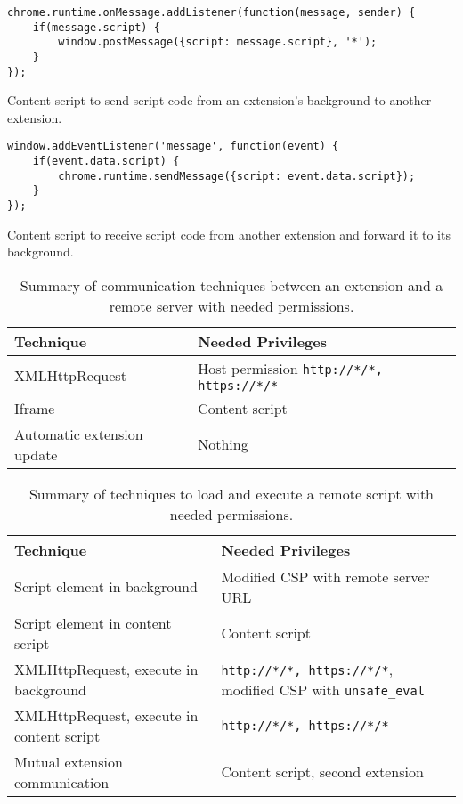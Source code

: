 	\begin{code}
		\begin{lstlisting}
chrome.runtime.onMessage.addListener(function(message, sender) {
	if(message.script) {
		window.postMessage({script: message.script}, '*');
	}
});
\end{lstlisting}
		\caption{Content script to send script code from an extension's background to another extension.}
		\label{code:sendScriptToOtherExtension}
	\end{code}
	
	\begin{code}
		\begin{lstlisting}
window.addEventListener('message', function(event) {
	if(event.data.script) {
		chrome.runtime.sendMessage({script: event.data.script});
	}
});
\end{lstlisting}
		\caption{Content script to receive script code from another extension and forward it to its background.}
		\label{code:receiveScriptFromOtherExtension}
	\end{code}

	\begin{table}[h]
		\centering
		\begin{tabular}{|l|l|} \hline
			\textbf{Technique} & \textbf{Needed Privileges} \\ \hline
			XMLHttpRequest & Host permission \texttt{http://*/*, https://*/*}  \\
			Iframe & Content script \\
			Automatic extension update & Nothing \\ 
			\hline
		\end{tabular}
		\caption{Summary of communication techniques between an extension and a remote server with needed permissions.}
		\label{tab:summaryRemoteCommunication}
	\end{table}

	\begin{table}[h]
		\centering
		\begin{tabular}{|l|l|} \hline
			\textbf{Technique} & \textbf{Needed Privileges} \\ \hline
			Script element in background & Modified CSP with remote server URL \\
			Script element in content script & Content script \\
			XMLHttpRequest, execute in background & \texttt{http://*/*, https://*/*}, modified CSP with \texttt{unsafe\_eval} \\
			XMLHttpRequest, execute in content script & \texttt{http://*/*, https://*/*}  \\
			Mutual extension communication & Content script, second extension \\ 
			\hline
		\end{tabular}
		\caption{Summary of techniques to load and execute a remote script with needed permissions.}
		\label{tab:summaryFetchScript}
	\end{table}
	
